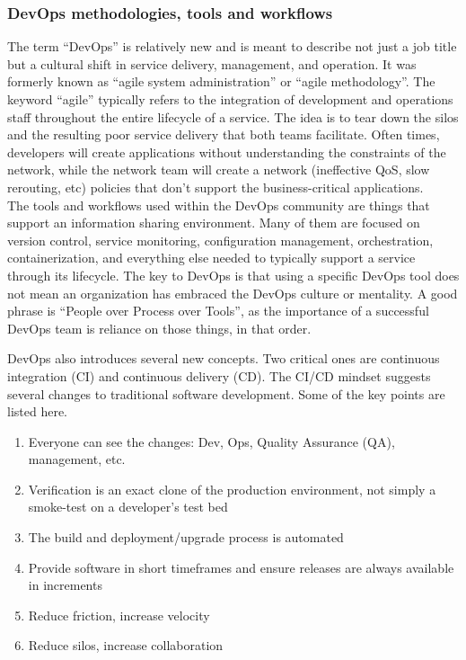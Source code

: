 \subsubsection{DevOps methodologies, tools and workflows}
The term ``DevOps'' is relatively new and is meant to describe not just a job
title but a cultural shift in service delivery, management, and operation. It
was formerly known as ``agile system administration'' or ``agile
methodology''. The keyword ``agile'' typically refers to the integration of
development and operations staff throughout the entire lifecycle of a service.
The idea is to tear down the silos and the resulting poor service delivery
that both teams facilitate. Often times, developers will create applications
without understanding the constraints of the network, while the network team
will create a network (ineffective QoS, slow rerouting, etc) policies that
don’t support the business-critical applications. \\

The tools and workflows used within the DevOps community are things that
support an information sharing environment. Many of them are focused on
version control, service monitoring, configuration management, orchestration,
containerization, and everything else needed to typically support a service
through its lifecycle. The key to DevOps is that using a specific DevOps tool
does not mean an organization has embraced the DevOps culture or mentality. A
good phrase is ``People over Process over Tools'', as the importance of a
successful DevOps team is reliance on those things, in that order.

DevOps also introduces several new concepts. Two critical ones are continuous
integration (CI) and continuous delivery (CD). The CI/CD mindset suggests
several changes to traditional software development. Some of the key points
are listed here.

\begin{enumerate}
  \item	Everyone can see the changes: Dev, Ops, Quality Assurance (QA),
  management, etc.
  \item	Verification is an exact clone of the production environment, not
  simply a smoke-test on a developer’s test bed
  \item	The build and deployment/upgrade process is automated
  \item	Provide software in short timeframes and ensure releases are always
  available in increments
  \item	Reduce friction, increase velocity
  \item	Reduce silos, increase collaboration
\end{enumerate}

